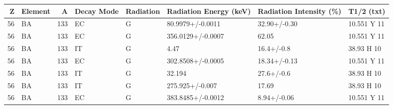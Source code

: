\begin{tabular}{rlrlllll}
\toprule
  Z & Element &    A & Decay Mode & Radiation & Radiation Energy (keV) & Radiation Intensity (\%) &   T1/2 (txt) \\
\midrule
 56 &      BA &  133 &         EC &         G &       80.9979+/-0.0011 &            32.90+/-0.30 &  10.551 Y 11 \\
 56 &      BA &  133 &         EC &         G &      356.0129+/-0.0007 &                   62.05 &  10.551 Y 11 \\
 56 &      BA &  133 &         IT &         G &                   4.47 &              16.4+/-0.8 &   38.93 H 10 \\
 56 &      BA &  133 &         EC &         G &      302.8508+/-0.0005 &            18.34+/-0.13 &  10.551 Y 11 \\
 56 &      BA &  133 &         IT &         G &                 32.194 &              27.6+/-0.6 &   38.93 H 10 \\
 56 &      BA &  133 &         IT &         G &        275.925+/-0.007 &                   17.69 &   38.93 H 10 \\
 56 &      BA &  133 &         EC &         G &      383.8485+/-0.0012 &             8.94+/-0.06 &  10.551 Y 11 \\
\bottomrule
\end{tabular}
